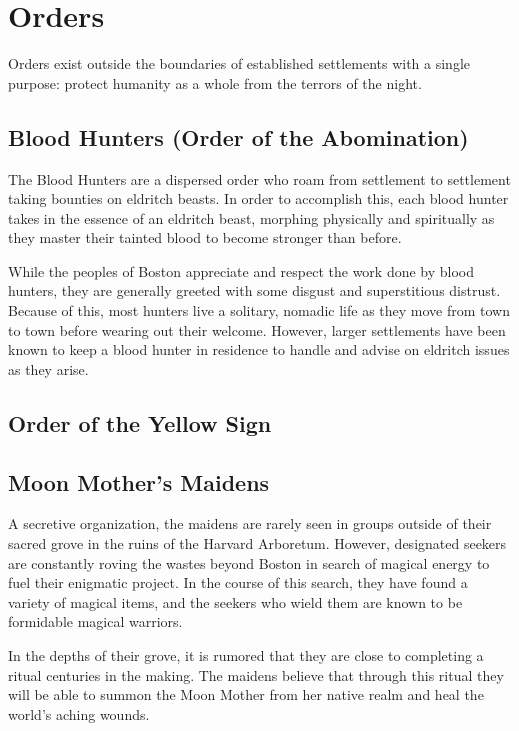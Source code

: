 \documentclass[././main.tex]{subfiles}
\begin{document}
\section{Orders}
Orders exist outside the boundaries of established settlements with a single purpose: protect humanity as a whole from the terrors of the night.

\subsection{Blood Hunters (Order of the Abomination)}
The Blood Hunters are a dispersed order who roam from settlement to settlement taking bounties on eldritch beasts. In order to accomplish this, each blood hunter takes in the essence of an eldritch beast, morphing physically and spiritually as they master their tainted blood to become stronger than before.

While the peoples of Boston appreciate and respect the work done by blood hunters, they are generally greeted with some disgust and superstitious distrust. Because of this, most hunters live a solitary, nomadic life as they move from town to town before wearing out their welcome. However, larger settlements have been known to keep a blood hunter in residence to handle and advise on eldritch issues as they arise.

\subsection{Order of the Yellow Sign}

\subsection{Moon Mother's Maidens}
A secretive organization, the maidens are rarely seen in groups outside of their sacred grove in the ruins of the Harvard Arboretum. However, designated seekers are constantly roving the wastes beyond Boston in search of magical energy to fuel their enigmatic project. In the course of this search, they have found a variety of magical items, and the seekers who wield them are known to be formidable magical warriors. 

In the depths of their grove, it is rumored that they are close to completing a ritual centuries in the making. The maidens believe that through this ritual they will be able to summon the Moon Mother from her native realm and heal the world's aching wounds. 
\end{document}
